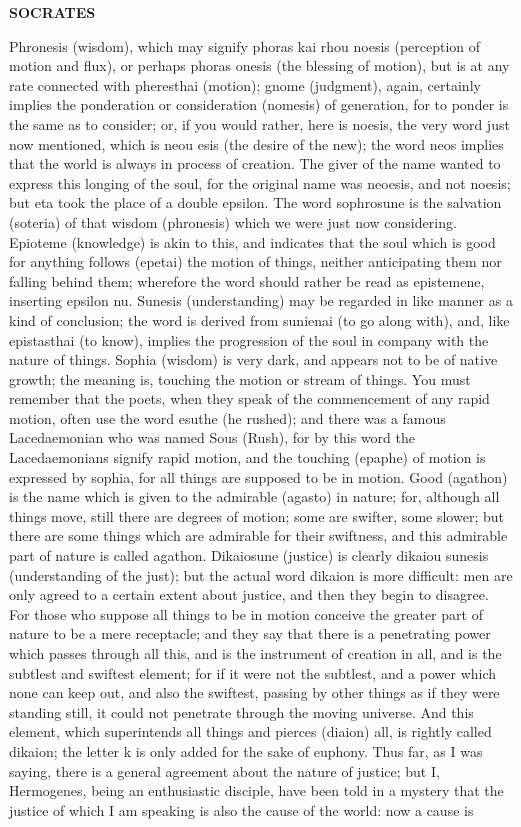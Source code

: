 \documentclass[11pt,letter]{article}
\begin{document}
\par \textbf{SOCRATES}
\par   Phronesis (wisdom), which may signify phoras kai rhou noesis (perception of motion and flux), or perhaps phoras onesis (the blessing of motion), but is at any rate connected with pheresthai (motion); gnome (judgment), again, certainly implies the ponderation or consideration (nomesis) of generation, for to ponder is the same as to consider; or, if you would rather, here is noesis, the very word just now mentioned, which is neou esis (the desire of the new); the word neos implies that the world is always in process of creation. The giver of the name wanted to express this longing of the soul, for the original name was neoesis, and not noesis; but eta took the place of a double epsilon. The word sophrosune is the salvation (soteria) of that wisdom (phronesis) which we were just now considering. Epioteme (knowledge) is akin to this, and indicates that the soul which is good for anything follows (epetai) the motion of things, neither anticipating them nor falling behind them; wherefore the word should rather be read as epistemene, inserting epsilon nu. Sunesis (understanding) may be regarded in like manner as a kind of conclusion; the word is derived from sunienai (to go along with), and, like epistasthai (to know), implies the progression of the soul in company with the nature of things. Sophia (wisdom) is very dark, and appears not to be of native growth; the meaning is, touching the motion or stream of things. You must remember that the poets, when they speak of the commencement of any rapid motion, often use the word esuthe (he rushed); and there was a famous Lacedaemonian who was named Sous (Rush), for by this word the Lacedaemonians signify rapid motion, and the touching (epaphe) of motion is expressed by sophia, for all things are supposed to be in motion. Good (agathon) is the name which is given to the admirable (agasto) in nature; for, although all things move, still there are degrees of motion; some are swifter, some slower; but there are some things which are admirable for their swiftness, and this admirable part of nature is called agathon. Dikaiosune (justice) is clearly dikaiou sunesis (understanding of the just); but the actual word dikaion is more difficult:  men are only agreed to a certain extent about justice, and then they begin to disagree. For those who suppose all things to be in motion conceive the greater part of nature to be a mere receptacle; and they say that there is a penetrating power which passes through all this, and is the instrument of creation in all, and is the subtlest and swiftest element; for if it were not the subtlest, and a power which none can keep out, and also the swiftest, passing by other things as if they were standing still, it could not penetrate through the moving universe. And this element, which superintends all things and pierces (diaion) all, is rightly called dikaion; the letter k is only added for the sake of euphony. Thus far, as I was saying, there is a general agreement about the nature of justice; but I, Hermogenes, being an enthusiastic disciple, have been told in a mystery that the justice of which I am speaking is also the cause of the world:  now a cause is 
\end{document}
